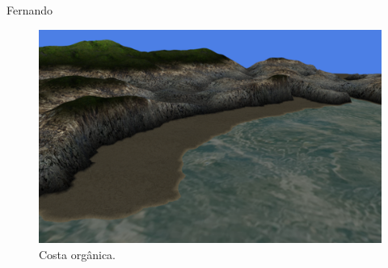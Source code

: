 \begin{frame}{Fernando}
    \begin{figure}
		\centering
        \includegraphics[width=.8\textwidth]
        {img/uffs/fernando/costaorganica.png}
        \caption{Costa orgânica.}
    \end{figure}
\end{frame}